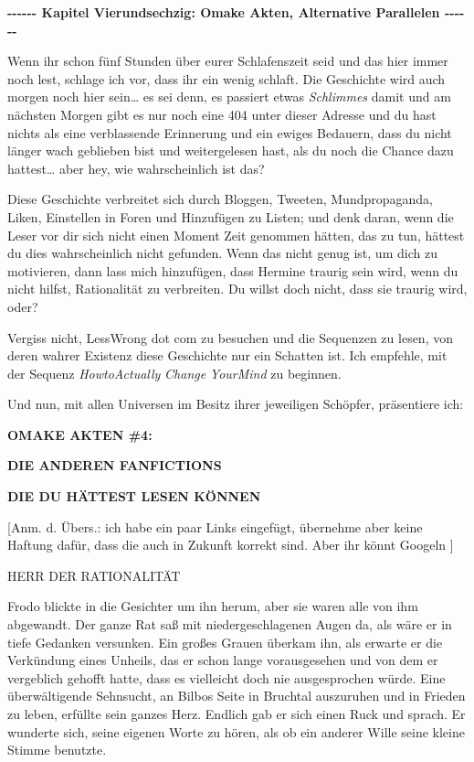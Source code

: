 

\hypertarget{omake-akten-alternative-parallelen}{%

\textbf{-\/-\/-\/-\/-\/- Kapitel Vierundsechzig: Omake Akten, Alternative Parallelen -\/-\/-\/-\/-\/-}

Wenn ihr schon fünf Stunden über eurer Schlafenszeit seid und das hier immer noch lest, schlage ich vor, dass ihr ein wenig schlaft. Die Geschichte wird auch morgen noch hier sein… es sei denn, es passiert etwas \emph{Schlimmes} damit und am nächsten Morgen gibt es nur noch eine 404 unter dieser Adresse und du hast nichts als eine verblassende Erinnerung und ein ewiges Bedauern, dass du nicht länger wach geblieben bist und weitergelesen hast, als du noch die Chance dazu hattest… aber hey, wie wahrscheinlich ist das?

Diese Geschichte verbreitet sich durch Bloggen, Tweeten, Mundpropaganda, Liken, Einstellen in Foren und Hinzufügen zu Listen; und denk daran, wenn die Leser vor dir sich nicht einen Moment Zeit genommen hätten, das zu tun, hättest du dies wahrscheinlich nicht gefunden. Wenn das nicht genug ist, um dich zu motivieren, dann lass mich hinzufügen, dass Hermine traurig sein wird, wenn du nicht hilfst, Rationalität zu verbreiten. Du willst doch nicht, dass sie traurig wird, oder?

Vergiss nicht, LessWrong dot com zu besuchen und die Sequenzen zu lesen, von deren wahrer Existenz diese Geschichte nur ein Schatten ist. Ich empfehle, mit der Sequenz \emph{HowtoActually} \emph{Change} \emph{YourMind} zu beginnen.

Und nun, mit allen Universen im Besitz ihrer jeweiligen Schöpfer, präsentiere ich:

\textbf{\textbf{OMAKE} \textbf{AKTEN} \textbf{\#4:}}

\textbf{\textbf{DIE ANDEREN FANFICTIONS}}

\textbf{\textbf{DIE DU HÄTTEST LESEN KÖNNEN}}

{[}Anm. d. Übers.: ich habe ein paar Links eingefügt, übernehme aber keine Haftung dafür, dass die auch in Zukunft korrekt sind. Aber ihr könnt Googeln {]}

HERR DER RATIONALITÄT

Frodo blickte in die Gesichter um ihn herum, aber sie waren alle von ihm abgewandt. Der ganze Rat saß mit niedergeschlagenen Augen da, als wäre er in tiefe Gedanken versunken. Ein großes Grauen überkam ihn, als erwarte er die Verkündung eines Unheils, das er schon lange vorausgesehen und von dem er vergeblich gehofft hatte, dass es vielleicht doch nie ausgesprochen würde. Eine überwältigende Sehnsucht, an Bilbos Seite in Bruchtal auszuruhen und in Frieden zu leben, erfüllte sein ganzes Herz. Endlich gab er sich einen Ruck und sprach. Er wunderte sich, seine eigenen Worte zu hören, als ob ein anderer Wille seine kleine Stimme benutzte.

}
